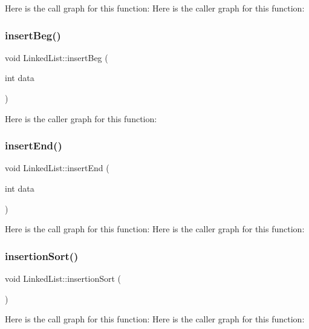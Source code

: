 Here is the call graph for this function\+:
Here is the caller graph for this function\+:
\mbox{\label{class_linked_list_a583e4bb42bb128feddb57767863fd28e}} 
\subsubsection{\texorpdfstring{insert\+Beg()}{insertBeg()}}
{\footnotesize\ttfamily void Linked\+List\+::insert\+Beg (\begin{DoxyParamCaption}\item[{int}]{data }\end{DoxyParamCaption})}

Here is the caller graph for this function\+:
\mbox{\label{class_linked_list_a8b87744316967b16f272be10cd6718ed}} 
\subsubsection{\texorpdfstring{insert\+End()}{insertEnd()}}
{\footnotesize\ttfamily void Linked\+List\+::insert\+End (\begin{DoxyParamCaption}\item[{int}]{data }\end{DoxyParamCaption})}

Here is the call graph for this function\+:
Here is the caller graph for this function\+:
\mbox{\label{class_linked_list_a04e277f98f8e6e5426f19ad780915e00}} 
\subsubsection{\texorpdfstring{insertion\+Sort()}{insertionSort()}}
{\footnotesize\ttfamily void Linked\+List\+::insertion\+Sort (\begin{DoxyParamCaption}{ }\end{DoxyParamCaption})}

Here is the call graph for this function\+:
Here is the caller graph for this function\+:
\mbox{\label{class_linked_list_ac517f07c7f197202fa085246fb3f07e8}} 

